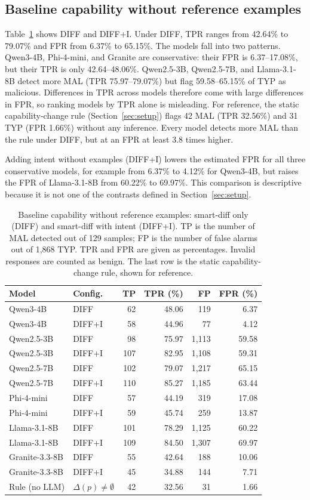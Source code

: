 \documentclass[a4paper,fleqn]{cas-dc}
\begin{document}
\subsection{Baseline capability without reference examples}
Table~\ref{tab:main} shows DIFF and DIFF+I. Under DIFF, TPR ranges from
42.64\% to 79.07\% and FPR from 6.37\% to 65.15\%. The models fall into two
patterns. Qwen3-4B, Phi-4-mini, and Granite are conservative: their FPR is
6.37--17.08\%, but their TPR is only 42.64--48.06\%. Qwen2.5-3B, Qwen2.5-7B, and
Llama-3.1-8B detect more MAL (TPR 75.97--79.07\%) but flag 59.58--65.15\% of TYP
as malicious. Differences in TPR across models therefore come with large
differences in FPR, so ranking models by TPR alone is misleading. For reference,
the static capability-change rule (Section~\ref{sec:setup}) flags 42 MAL
(TPR 32.56\%) and 31 TYP (FPR 1.66\%) without any inference. Every model detects
more MAL than the rule under DIFF, but at an FPR at least 3.8 times higher.

Adding intent without examples (DIFF+I) lowers the estimated FPR for all three
conservative models, for example from 6.37\% to 4.12\% for Qwen3-4B, but raises
the FPR of Llama-3.1-8B from 60.22\% to 69.97\%. This comparison is descriptive
because it is not one of the contrasts defined in Section~\ref{sec:setup}.
\begin{table}[t]
\centering\footnotesize
\setlength{\tabcolsep}{3pt}
\caption{Baseline capability without reference examples: smart-diff only (DIFF) and smart-diff with intent (DIFF+I). TP is the number of MAL detected out of 129 samples; FP is the number of false alarms out of 1,868 TYP. TPR and FPR are given as percentages. Invalid responses are counted as benign. The last row is the static capability-change rule, shown for reference.}
\label{tab:main}
\begin{tabular}{llrrrr}
\toprule
Model & Config. & TP & TPR (\%) & FP & FPR (\%) \\
\midrule
Qwen3-4B & DIFF & 62 & 48.06 & 119 & 6.37 \\
Qwen3-4B & DIFF+I & 58 & 44.96 & 77 & 4.12 \\
Qwen2.5-3B & DIFF & 98 & 75.97 & 1,113 & 59.58 \\
Qwen2.5-3B & DIFF+I & 107 & 82.95 & 1,108 & 59.31 \\
Qwen2.5-7B & DIFF & 102 & 79.07 & 1,217 & 65.15 \\
Qwen2.5-7B & DIFF+I & 110 & 85.27 & 1,185 & 63.44 \\
Phi-4-mini & DIFF & 57 & 44.19 & 319 & 17.08 \\
Phi-4-mini & DIFF+I & 59 & 45.74 & 259 & 13.87 \\
Llama-3.1-8B & DIFF & 101 & 78.29 & 1,125 & 60.22 \\
Llama-3.1-8B & DIFF+I & 109 & 84.50 & 1,307 & 69.97 \\
Granite-3.3-8B & DIFF & 55 & 42.64 & 188 & 10.06 \\
Granite-3.3-8B & DIFF+I & 45 & 34.88 & 144 & 7.71 \\
\midrule
Rule (no LLM) & $\Delta(p)\neq\emptyset$ & 42 & 32.56 & 31 & 1.66 \\
\bottomrule
\end{tabular}
\end{table}
\end{document}

